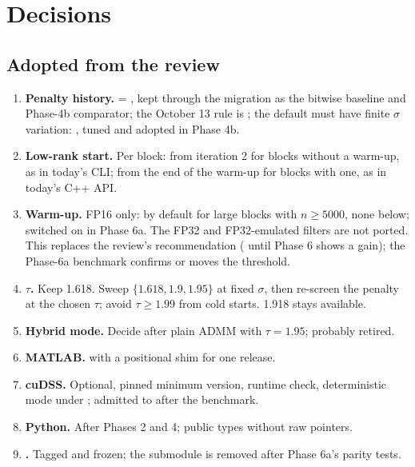 \documentclass[11pt]{article}
\begin{document}
\section{Decisions}\label{sec:decisions}

\subsection{Adopted from the review}
\begin{enumerate}[label=\textbf{Q\arabic*.}]
  \item \textbf{Penalty history.}  = , kept through the migration as the
  bitwise baseline and Phase-4b comparator; the October 13 rule is ; the default must
  have finite $\sigma$ variation: , tuned and adopted in Phase 4b.
  \item \textbf{Low-rank start.} Per block: from iteration 2 for blocks without a warm-up, as in today's CLI;
  from the end of the warm-up for blocks with one, as in today's C++ API.
  \item \textbf{Warm-up.} FP16 only:  by default for large blocks with $n\ge5000$, none
  below; switched on in Phase 6a. The FP32 and FP32-emulated filters are not ported. This replaces the review's
  recommendation ( until Phase 6 shows a gain); the Phase-6a benchmark confirms or moves the
  threshold.
  \item \textbf{$\tau$.} Keep 1.618. Sweep $\{1.618, 1.9, 1.95\}$ at fixed $\sigma$, then re-screen the penalty at
  the chosen $\tau$; avoid $\tau\ge1.99$ from cold starts. 1.918 stays available.
  \item \textbf{Hybrid mode.} Decide after plain ADMM with $\tau=1.95$; probably retired.
  \item \textbf{MATLAB.}  with a positional shim for one release.
  \item \textbf{cuDSS.} Optional, pinned minimum version, runtime check, deterministic mode under ;
  admitted to  after the benchmark.
  \item \textbf{Python.} After Phases 2 and 4; public types without raw pointers.
  \item \textbf{.} Tagged and frozen; the submodule is removed after Phase 6a's parity tests.
\end{enumerate}
\end{document}
